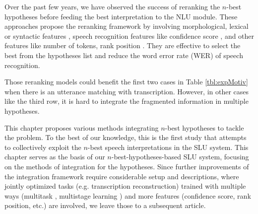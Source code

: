 Over the past few years, we have observed the success of reranking the $n$-best hypotheses 
\citep{peng2013search, charniak2005coarse, morbini2012reranking,  dikici2012classification, Sak2011DiscriminativeRO, sak2010fly,discriminative, collins2005discriminative, chan2004improving}
before feeding the best interpretation to the NLU module. These approaches propose the reranking framework by involving morphological, lexical or syntactic features \citep{discriminative, collins2005discriminative, chan2004improving}, speech recognition features like confidence score \citep{peng2013search, morbini2012reranking}, and other features like number of tokens, rank position \citep{peng2013search}.  They are effective to select the best from the hypotheses list and reduce the word error rate (WER) \citep{oba2007approach} of speech recognition. 

Those reranking models could benefit the first two cases in Table \ref{tbl:expMotiv} when there is an utterance matching with transcription. However, in other cases like the third row, it is hard to integrate the fragmented information  in multiple hypotheses. 

This chapter proposes various methods integrating $n$-best hypotheses to tackle the problem. To the best of our knowledge, this is the first study that attempts to collectively exploit the $n$-best speech interpretations in the SLU system.  This chapter serves as the basis of our $n$-best-hypotheses-based SLU system, focusing on the methods of integration for the hypotheses. 
Since further improvements of the integration framework require considerable setup and descriptions, where jointly optimized tasks (e.g. transcription reconstruction) trained with multiple ways (multitask \citep{caruana1997multitask}, multistage learning \citep{gong2013multi}) and more features (confidence score, rank position, etc.) are involved, we leave those to a subsequent article.

